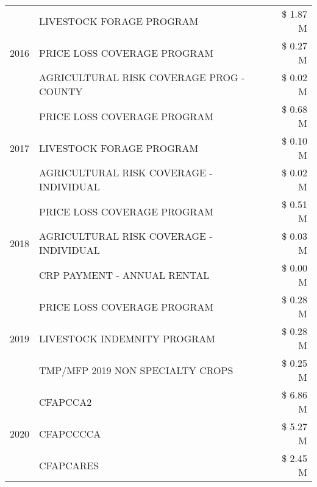 \begin{tabular}{llr}
\multirow[t]{3}{*}{2016} & LIVESTOCK FORAGE PROGRAM & \$ 1.87 M \\
 & PRICE LOSS COVERAGE PROGRAM & \$ 0.27 M \\
 & AGRICULTURAL RISK COVERAGE PROG - COUNTY & \$ 0.02 M \\
\cline{1-3}
\multirow[t]{3}{*}{2017} & PRICE LOSS COVERAGE PROGRAM & \$ 0.68 M \\
 & LIVESTOCK FORAGE PROGRAM & \$ 0.10 M \\
 & AGRICULTURAL RISK COVERAGE - INDIVIDUAL & \$ 0.02 M \\
\cline{1-3}
\multirow[t]{3}{*}{2018} & PRICE LOSS COVERAGE PROGRAM & \$ 0.51 M \\
 & AGRICULTURAL RISK COVERAGE - INDIVIDUAL & \$ 0.03 M \\
 & CRP PAYMENT - ANNUAL RENTAL & \$ 0.00 M \\
\cline{1-3}
\multirow[t]{3}{*}{2019} & PRICE LOSS COVERAGE PROGRAM & \$ 0.28 M \\
 & LIVESTOCK INDEMNITY PROGRAM & \$ 0.28 M \\
 & TMP/MFP 2019 NON SPECIALTY CROPS & \$ 0.25 M \\
\cline{1-3}
\multirow[t]{3}{*}{2020} & CFAPCCA2 & \$ 6.86 M \\
 & CFAPCCCCA & \$ 5.27 M \\
 & CFAPCARES & \$ 2.45 M \\
\cline{1-3}
\bottomrule
\end{tabular}
